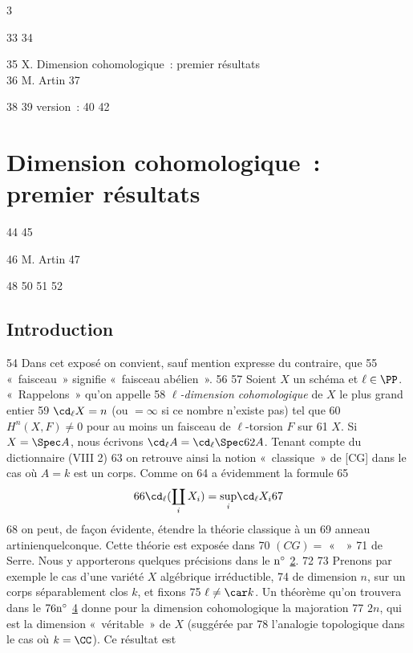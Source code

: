 3	\documentclass[10pt]{../fichiers-configuration-latex/smfart}
\begin{document}
    33	
    34	\begin{center}
    35	X. Dimension cohomologique : premier résultats\\
    36	M. Artin
    37	\end{center}
    38	
    39	version : \showgitstatus{}
    40		
    42		\chapter{Dimension cohomologique : premier résultats}
    44	%
    45	\begin{center}
    46	M. Artin
    47	\end{center}
    48		
    50	\setcounter{pageoriginal}{42}
    51	
    52	\section{Introduction}	
    54	Dans cet exposé on convient, sauf mention expresse du contraire, que
    55	« faisceau » signifie « faisceau abélien ».
    56	
    57	Soient $X$ un schéma et $\ell\in \PP$. « Rappelons » qu'on appelle
    58	\emph{$\ell$-dimension cohomologique} de $X$ le plus grand entier
    59	$\cd_{\ell}X=n$ (ou $=\infty$ si ce nombre n'existe pas) tel que
    60	$H^n(X,F)\neq 0$ pour au moins un faisceau de $\ell$-torsion $F$ sur
    61	$X$. Si $X=\Spec A$, nous écrivons $\cd_{\ell} A=\cd_{\ell}\Spec
    62	A$. Tenant compte du dictionnaire (VIII 2) %
    63	on retrouve ainsi la notion « classique » de [CG] dans le cas où $A=k$ est un corps. Comme on
    64	a évidemment la formule
    65	$$
    66	\cd_{\ell}(\coprod_i X_i)=\displaystyle{\mathop{\sup}_i} \cd_{\ell}X_i
    67	$$
    68	on peut, de façon évidente, étendre la théorie classique à un
    69	anneau artinien\pageoriginale quelconque. Cette théorie est exposée dans
    70	$(CG)=$ «  » %
    71	de Serre. Nous y apporterons quelques précisions dans le ${\rm n^{\circ}}$ \hyperref[X.sec2]{2}.
    72	
    73	Prenons par exemple le cas d'une variété $X$ algébrique irréductible,
    74	de dimension $n$, sur un corps séparablement clos $k$, et fixons
    75	$\ell\neq \car k$. Un théorème qu'on trouvera dans le ${\rm
    76	  n^{\circ}}$ \hyperref[X.sec4]{4} donne pour la dimension cohomologique la majoration
    77	$2n$, qui est la dimension « véritable » de $X$ (suggérée par
    78	l'analogie topologique dans le cas où $k=\CC$). Ce résultat est
\end{document}
